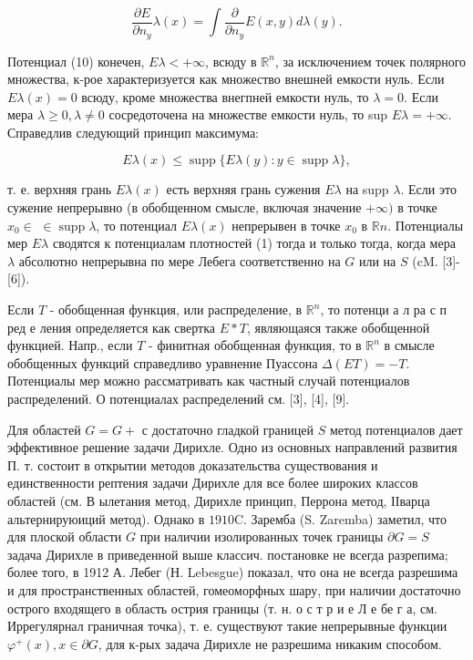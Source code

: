\documentclass[10pt]{article}
\begin{document}
\[

\frac{\partial E}{\partial n_{y}} \lambda(x)=\int \frac{\partial}{\partial n_{y}} E(x, y) d \lambda(y) .

\]



Потенциал (10) конечен, $E \lambda<+\infty$, всюду в $\mathbb{R}^{n}$, за исключением точек полярного множества, к-рое характеризуется как множество внешней емкости нуль. Если $E \lambda(x)=0$ всюду, кроме множества внегпней емкости нуль, то $\lambda=0$. Если мера $\lambda \geqslant 0, \lambda \neq 0$ сосредоточена на множестве емкости нуль, то sup $E \lambda=+\infty$. Справедлив следующий принцип максимума:



\[

E \lambda(x) \leqslant \operatorname{supp}\{E \lambda(y): y \in \operatorname{supp} \lambda\},

\]



т. е. верхняя грань $E \lambda(x)$ есть верхняя грань сужения $E \lambda$ на supp $\lambda$. Если это сужение непрерывно (в обобщенном смысле, включая значение $+\infty)$ в точке $x_{0} \in$ $\in \operatorname{supp} \lambda$, то потенциал $E \lambda(x)$ непрерывен в точке $x_{0}$ в $\mathbb{R} n$. Потенциалы мер $E \lambda$ сводятся к потенциалам плотностей (1) тогда и только тогда, когда мера $\lambda$ абсолютно непрерывна по мере Лебега соответственно на $G$ или на $S$ (cM. [3]-[6]).



Если $T$ - обобщенная функция, или распределение, в $\mathbb{R}^{n}$, то потенци а л ра с п ред е ления определяется как свертка $E * T$, являющаяся также обобщенной функцией. Напр., если $T$ - финитная обобщенная функция, то в $\mathbb{R}^{n}$ в смысле обобщенных функций справедливо уравнение Пуассона $\Delta(E T)=-T$. Потенциалы мер можно рассматривать как частный случай потенциалов распределений. О потенциалах распределений см. [3], [4], [9].



Для областей $G=G+$ с достаточно гладкой границей $S$ метод потенциалов дает эффективное решение задачи Дирихле. Одно из основных направлений развития П. т. состоит в открытии методов доказательства существования и единственности рептения задачи Дирихле для все более широких классов областей (см. В ылетания метод, Дирихле принцип, Перрона метод, ІІварца альтернируюиций метод). Однако в $1910 \mathrm{C}$. Заремба (S. Zaremba) заметил, что для плоской области $G$ при наличии изолированных точек границы $\partial G=S$ задача Дирихле в приведенной выше классич. постановке не всегда разрепима; более того, в 1912 А. Лебег (Н. Lebesgue) показал, что она не всегда разрешима и для пространственных областей, гомеоморфных шару, при наличии достаточно острого входящего в область острия границы (т. н. о с т р и е Л е бе г а, см. Иррегулярнал граничная точка), т. е. существуют такие непрерывные функции $\varphi^{+}(x), x \in \partial G$, для к-рых задача Дирихле не разрешима никаким способом.
\end{document}
